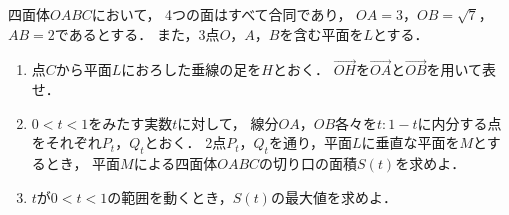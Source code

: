 \documentclass[../../main.tex]{subfiles}
\begin{document}
四面体$OABC$において，
4つの面はすべて合同であり，
$OA=3$，$OB=\sqrt7$，$AB=2$であるとする．
また，3点$O$，$A$，$B$を含む平面を$L$とする．
\begin{enumerate}
  \item 点$C$から平面$L$におろした垂線の足を$H$とおく．
    $\overrightarrow{OH}$を$\overrightarrow{OA}$と$\overrightarrow{OB}$を用いて表せ．
  \item $0<t<1$をみたす実数$t$に対して，
    線分$OA$，$OB$各々を$t:1-t$に内分する点をそれぞれ$P_t$，$Q_t$とおく．
    2点$P_t$，$Q_t$を通り，平面$L$に垂直な平面を$M$とするとき，
    平面$M$による四面体$OABC$の切り口の面積$S(t)$を求めよ．
  \item $t$が$0<t<1$の範囲を動くとき，$S(t)$の最大値を求めよ．
\end{enumerate}
\end{document}
